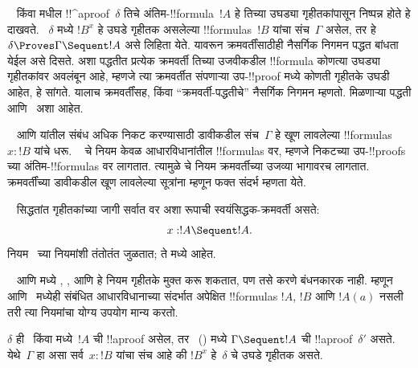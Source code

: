 \documentclass[../../../include/open-logic-section]{subfiles}
\begin{document}


~ किंवा
 मधील
!!^a{proof}~$\delta$
तिचे अंतिम-!!{formula}~$!A$
हे तिच्या उघड्या गृहीतकांपासून
निष्पन्न होते हे दाखवते.
~$\delta$ मध्ये $!B^x$
हे उघडे गृहीतक असलेल्या
!!{formula}s~$!B$
यांचा संच~$\Gamma$
असेल, तर हे
$\delta \Proves \Gamma
\Sequent !A$ असे
लिहिता येते.
यावरून क्रमवर्तींसाठीही
नैसर्गिक निगमन पद्धत
बांधता येईल असे दिसते.
अशा पद्धतीत प्रत्येक
क्रमवर्ती तिच्या उजवीकडील
!!{formula} कोणत्या
उघड्या गृहीतकांवर अवलंबून
आहे, म्हणजे त्या
क्रमवर्तीत संपणाऱ्या
उप-!!{proof} मध्ये
कोणती गृहीतके उघडी
आहेत, हे सांगते.
यालाच क्रमवर्तींसह,
किंवा “क्रमवर्ती-पद्धतीचे”
नैसर्गिक निगमन म्हणतो.
मिळणाऱ्या पद्धती
 आणि~
अशा आहेत.

~ आणि
 यांतील
संबंध अधिक निकट करण्यासाठी
डावीकडील संच~$\Gamma$
हे खूण लावलेल्या
!!{formula}s~$x:!B$
यांचे धरू. ~
चे नियम केवळ
आधारविधानांतील
!!{formula}s वर,
म्हणजे निकटच्या
उप-!!{proof}s च्या
अंतिम-!!{formula}s वर
लागतात. त्यामुळे
 चे नियम
क्रमवर्तीच्या उजव्या
भागावरच लागतात.
क्रमवर्तींच्या डावीकडील
खूण लावलेल्या सूत्रांना
म्हणून फक्त संदर्भ
म्हणता येते.

~ सिद्धतांत
गृहीतकांच्या जागी
सर्वात वर अशा रूपाची
स्वयंसिद्धक-क्रमवर्ती असते:
\[x:!A \Sequent !A.\]
नियम~
च्या नियमांशी तंतोतंत
जुळतात; ते
 मध्ये आहेत.



~ आणि
 मध्ये
\Intro{\lif},
\Intro{\lnot},
\Elim{\lor} आणि
\Elim{\lexists} हे
नियम गृहीतके मुक्त करू
शकतात, पण तसे करणे
बंधनकारक नाही.
म्हणून~
आणि~
मध्येही संबंधित आधारविधानाच्या
संदर्भात अपेक्षित
!!{formula}s $!A$,
$!B$ आणि $!A(a)$
नसली तरी त्या
नियमांचा योग्य उपयोग
मान्य करतो.

\begin{prop}
$\delta$ ही~
किंवा 
मध्ये~$!A$ ची
!!a{proof} असेल,
तर~
() मध्ये
$\Gamma \Sequent !A$
ची !!a{proof}~$\delta'$
असते. येथे~$\Gamma$
हा असा सर्व~$x:!B$
यांचा संच आहे की
$!B^x$ हे~$\delta$
चे उघडे गृहीतक असते.
\end{prop}
\end{document}
